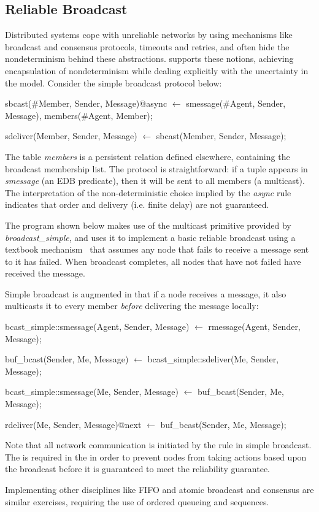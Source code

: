 \subsection{Reliable Broadcast}
Distributed systems cope with unreliable networks by using mechanisms like broadcast and consensus protocols, 
timeouts and retries, and often hide the nondeterminism behind these abstractions.  \lang supports these notions,
achieving encapsulation of nondeterminism while dealing explicitly with the uncertainty in the model.  Consider the simple
broadcast protocol below:

\begin{Dedalus}
sbcast(#Member, Sender, Message)@async \(\leftarrow\)
    smessage(#Agent, Sender, Message),
    members(#Agent, Member);

sdeliver(Member, Sender, Message) \(\leftarrow\)
    sbcast(Member, Sender, Message);

\end{Dedalus}

The table \emph{members} is a persistent relation defined elsewhere, containing the broadcast 
membership list.  
The protocol is straightforward: if a tuple appears in \emph{smessage} (an EDB predicate), then
it will be sent to all members (a multicast).  The interpretation of the non-deterministic choice implied by the
\emph{async} rule indicates that order and delivery (i.e. finite delay) are not guaranteed.

The program shown below makes use of the
multicast primitive provided by \emph{broadcast\_simple}, and uses it
to implement a basic reliable broadcast using a textbook
mechanism~\cite{mullender} that assumes any node that fails to receive
a message sent to it has failed.  When broadcast completes, all nodes
that have not failed have received the message.

Simple broadcast is augmented in that if a node receives a message, it 
also multicasts it to every member \emph{before} delivering the message locally:

\begin{Dedalus}

bcast_simple::smessage(Agent, Sender, Message)  \(\leftarrow\)
    rmessage(Agent, Sender, Message);

buf_bcast(Sender, Me, Message)  \(\leftarrow\)
    bcast_simple::sdeliver(Me, Sender, Message);

bcast_simple::smessage(Me, Sender, Message)  \(\leftarrow\)
    buf_bcast(Sender, Me, Message);

rdeliver(Me, Sender, Message)@next  \(\leftarrow\)
    buf_bcast(Sender, Me, Message);
\end{Dedalus}

Note that all network communication is initiated by the
 rule in simple broadcast.  The  is
required in the  in order to prevent nodes from
taking actions based upon the broadcast before it is guaranteed to
meet the reliability guarantee.

Implementing other disciplines like FIFO and atomic broadcast and
consensus are similar exercises, requiring the use of ordered queueing
and sequences.

